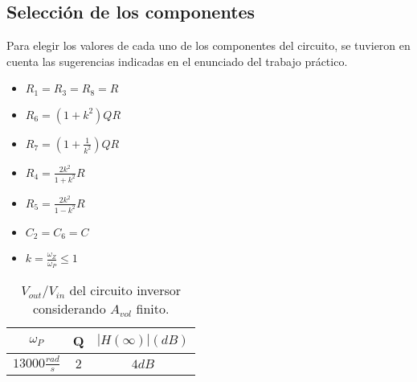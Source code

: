 \subsection{Selecci\'on de los componentes}
Para elegir los valores de cada uno de los componentes del circuito, se tuvieron en cuenta las sugerencias indicadas en el enunciado del trabajo pr\'actico.

\begin{itemize}
	\item $R_1 = R_3 = R_8 = R$
	\item $R_6 = (1 + k^2) Q R$
	\item $R_7 = (1 + \frac{1}{k^2})Q R$
	\item $R_4 = \frac{2k^2}{1+k^2}R$
	\item $R_5 = \frac{2k^2}{1-k^2}R$
	\item $C_2 = C_6 = C$
	\item $k = \frac{\omega_Z}{\omega_P} \leqslant 1 $
\end{itemize}

\begin{table}[h!]
	\centering
	\begin{tabular}{c c c}%
		\bfseries $\omega_P$ & Q & $|H(\infty)| (dB)$ \\ \hline
		$13000 \frac{rad}{s}$ & $2$ & $4dB$\\
		\hline
	\end{tabular}
	\caption{$V_{out}/V_{in}$ del circuito inversor considerando $A_{vol}$ finito.}
	\label{avolf}
\end{table}